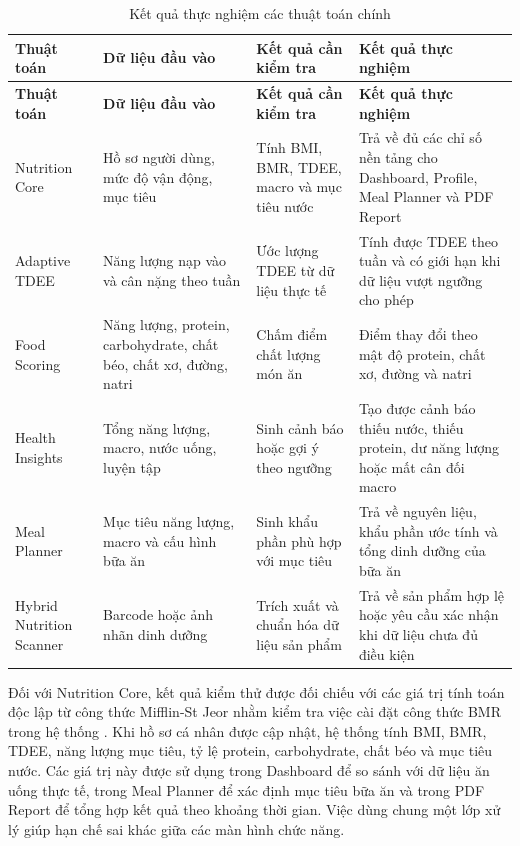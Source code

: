 \documentclass[12pt, a4paper]{report}
\begin{document}
\begin{longtable}{|>{\raggedright\arraybackslash}p{3cm}|>{\raggedright\arraybackslash}p{3cm}|>{\raggedright\arraybackslash}p{4cm}|>{\raggedright\arraybackslash}p{5cm}|}
\caption{Kết quả thực nghiệm các thuật toán chính}
\label{tab:kq_thuc_nghiem_thuat_toan} \\
\hline
\textbf{Thuật toán} & \textbf{Dữ liệu đầu vào} & \textbf{Kết quả cần kiểm tra} & \textbf{Kết quả thực nghiệm} \\
\hline
\endfirsthead
\hline
\textbf{Thuật toán} & \textbf{Dữ liệu đầu vào} & \textbf{Kết quả cần kiểm tra} & \textbf{Kết quả thực nghiệm} \\
\hline
\endhead

Nutrition Core & Hồ sơ người dùng, mức độ vận động, mục tiêu & Tính BMI, BMR, TDEE, macro và mục tiêu nước & Trả về đủ các chỉ số nền tảng cho Dashboard, Profile, Meal Planner và PDF Report \\
\hline
Adaptive TDEE & Năng lượng nạp vào và cân nặng theo tuần & Ước lượng TDEE từ dữ liệu thực tế & Tính được TDEE theo tuần và có giới hạn khi dữ liệu vượt ngưỡng cho phép \\
\hline
Food Scoring & Năng lượng, protein, carbohydrate, chất béo, chất xơ, đường, natri & Chấm điểm chất lượng món ăn & Điểm thay đổi theo mật độ protein, chất xơ, đường và natri \\
\hline
Health Insights & Tổng năng lượng, macro, nước uống, luyện tập & Sinh cảnh báo hoặc gợi ý theo ngưỡng & Tạo được cảnh báo thiếu nước, thiếu protein, dư năng lượng hoặc mất cân đối macro \\
\hline
Meal Planner & Mục tiêu năng lượng, macro và cấu hình bữa ăn & Sinh khẩu phần phù hợp với mục tiêu & Trả về nguyên liệu, khẩu phần ước tính và tổng dinh dưỡng của bữa ăn \\
\hline
Hybrid Nutrition Scanner & Barcode hoặc ảnh nhãn dinh dưỡng & Trích xuất và chuẩn hóa dữ liệu sản phẩm & Trả về sản phẩm hợp lệ hoặc yêu cầu xác nhận khi dữ liệu chưa đủ điều kiện \\
\hline
\end{longtable}


Đối với Nutrition Core, kết quả kiểm thử được đối chiếu với các giá trị tính toán độc lập từ công thức Mifflin-St Jeor nhằm kiểm tra việc cài đặt công thức BMR trong hệ thống \cite{mifflin1990}. Khi hồ sơ cá nhân được cập nhật, hệ thống tính BMI, BMR, TDEE, năng lượng mục tiêu, tỷ lệ protein, carbohydrate, chất béo và mục tiêu nước. Các giá trị này được sử dụng trong Dashboard để so sánh với dữ liệu ăn uống thực tế, trong Meal Planner để xác định mục tiêu bữa ăn và trong PDF Report để tổng hợp kết quả theo khoảng thời gian. Việc dùng chung một lớp xử lý giúp hạn chế sai khác giữa các màn hình chức năng.
\end{document}
